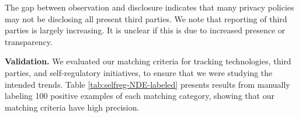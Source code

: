 The gap between observation and disclosure indicates that many privacy policies may not be disclosing all present third parties. 
We note that reporting of third parties is largely increasing. It is unclear if this is due to increased presence or transparency.

\textbf{Validation.} We evaluated our matching criteria for tracking technologies, third parties, and self-regulatory initiatives, to ensure that we were studying the intended trends. Table \ref{tab:selfreg-NDE-labeled} presents results from manually labeling 100 positive examples of each matching category, showing that our matching criteria have high precision.

{
\begin{table}[]
\centering
{}
\caption{Manual validation of 100 positives for each query. For third parties and tracking technologies, positives indicate the term is used in a context related to tracking. For self-regulatory initiatives, positives indicate a relationship with the initiative.}
\label{tab:selfreg-NDE-labeled}
\end{table}
}

